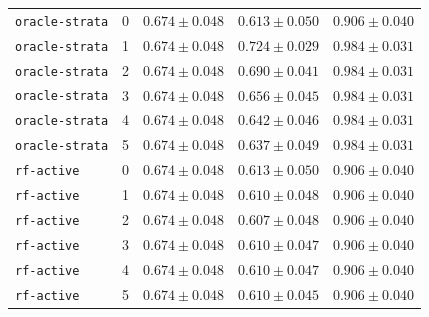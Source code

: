 \documentclass{article}
\begin{document}
\begin{center}
\begin{tabular}{llccc}
\texttt{oracle-strata} & 0 & $0.674 \pm 0.048$ & $0.613 \pm 0.050$ & $0.906 \pm 0.040$ \\
\texttt{oracle-strata} & 1 & $0.674 \pm 0.048$ & $0.724 \pm 0.029$ & $0.984 \pm 0.031$ \\
\texttt{oracle-strata} & 2 & $0.674 \pm 0.048$ & $0.690 \pm 0.041$ & $0.984 \pm 0.031$ \\
\texttt{oracle-strata} & 3 & $0.674 \pm 0.048$ & $0.656 \pm 0.045$ & $0.984 \pm 0.031$ \\
\texttt{oracle-strata} & 4 & $0.674 \pm 0.048$ & $0.642 \pm 0.046$ & $0.984 \pm 0.031$ \\
\texttt{oracle-strata} & 5 & $0.674 \pm 0.048$ & $0.637 \pm 0.049$ & $0.984 \pm 0.031$ \\
\texttt{rf-active} & 0 & $0.674 \pm 0.048$ & $0.613 \pm 0.050$ & $0.906 \pm 0.040$ \\
\texttt{rf-active} & 1 & $0.674 \pm 0.048$ & $0.610 \pm 0.048$ & $0.906 \pm 0.040$ \\
\texttt{rf-active} & 2 & $0.674 \pm 0.048$ & $0.607 \pm 0.048$ & $0.906 \pm 0.040$ \\
\texttt{rf-active} & 3 & $0.674 \pm 0.048$ & $0.610 \pm 0.047$ & $0.906 \pm 0.040$ \\
\texttt{rf-active} & 4 & $0.674 \pm 0.048$ & $0.610 \pm 0.047$ & $0.906 \pm 0.040$ \\
\texttt{rf-active} & 5 & $0.674 \pm 0.048$ & $0.610 \pm 0.045$ & $0.906 \pm 0.040$ \\
\bottomrule
\end{tabular}
\end{center}
\end{document}
